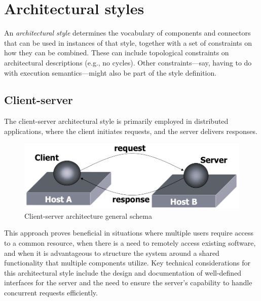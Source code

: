 \section{Architectural styles}  

\begin{definition}
    An \emph{architectural style} determines the vocabulary of components and connectors that can be used in instances of that style, together with a set of constraints on how they can be combined.
    These can include topological constraints on architectural descriptions (e.g., no cycles). 
    Other constraints—say, having to do with execution semantics—might also be part of the style definition.
\end{definition}

\subsection*{Client-server}
The client-server architectural style is primarily employed in distributed applications, where the client initiates requests, and the server delivers responses.
\begin{figure}[H]
    \centering
    \includegraphics[width=0.5\linewidth]{images/clientserver.png}
    \caption{Client-server architecture general schema}
\end{figure}
This approach proves beneficial in situations where multiple users require access to a common resource, when there is a need to remotely access existing software, and when it is advantageous to structure the system around a shared functionality that multiple components utilize.
Key technical considerations for this architectural style include the design and documentation of well-defined interfaces for the server and the need to ensure the server's capability to handle concurrent requests efficiently.